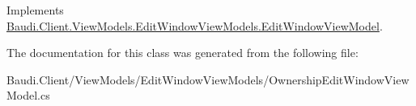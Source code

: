 Implements \hyperlink{class_baudi_1_1_client_1_1_view_models_1_1_edit_window_view_models_1_1_edit_window_view_model_aeae328bfe7608e01ce3c54da0c13f781}{Baudi.\+Client.\+View\+Models.\+Edit\+Window\+View\+Models.\+Edit\+Window\+View\+Model}.



The documentation for this class was generated from the following file\+:\begin{DoxyCompactItemize}
\item 
Baudi.\+Client/\+View\+Models/\+Edit\+Window\+View\+Models/Ownership\+Edit\+Window\+View\+Model.\+cs\end{DoxyCompactItemize}
